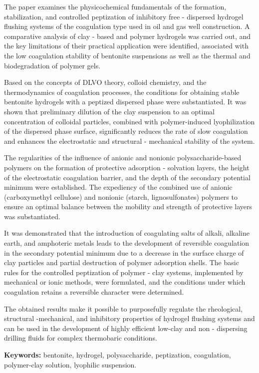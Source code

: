The paper examines the physicochemical fundamentals of the formation,
stabilization, and controlled peptization of inhibitory free - dispersed
hydrogel flushing systems of the coagulation type used in oil and gas
well construction. A comparative analysis of clay - based and polymer
hydrogels was carried out, and the key limitations of their practical
application were identified, associated with the low coagulation
stability of bentonite suspensions as well as the thermal and
biodegradation of polymer gels.

Based on the concepts of DLVO theory, colloid chemistry, and the
thermodynamics of coagulation processes, the conditions for obtaining
stable bentonite hydrogels with a peptized dispersed phase were
substantiated. It was shown that preliminary dilution of the clay
suspension to an optimal concentration of colloidal particles, combined
with polymer-induced lyophilization of the dispersed phase surface,
signifi\-cantly reduces the rate of slow coagulation and enhances the
electrostatic and structural - mechanical stability of the system.

The regularities of the influence of anionic and nonionic
polysaccharide-based polymers on the formation of protective adsorption
- solvation layers, the height of the electrostatic coagulation barrier,
and the depth of the secondary potential minimum were established. The
expediency of the combined use of anionic (carboxymethyl cellulose) and
nonionic (starch, lignosulfonates) polymers to ensure an optimal balance
between the mobility and strength of protective layers was
substantiated.

It was demonstrated that the introduction of coagulating salts of
alkali, alkaline earth, and amphoteric metals leads to the development
of reversible coagulation in the secondary potential minimum due to a
decrease in the surface charge of clay particles and partial destruction
of polymer adsorption shells. The basic rules for the controlled
peptization of polymer - clay systems, implemented by mechanical or
ionic methods, were formulated, and the conditions under which
coagulation retains a reversible character were determined.

The obtained results make it possible to purposefully regulate the
rheological, structural -mechanical, and inhibitory properties of
hydrogel flushing systems and can be used in the development of highly
efficient low-clay and non - dispersing drilling fluids for complex
thermobaric conditions.

{\bfseries Keywords:} bentonite, hydrogel, polysaccharide, peptization,
coagulation, polymer-clay solution, lyo\-philic suspension.

